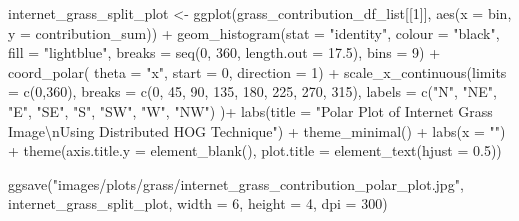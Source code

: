 \documentclass[
  letterpaper,
  DIV=11,
  numbers=noendperiod]{scrreprt}
\newenvironment{Shaded}{\begin{snugshade}}{\end{snugshade}}
\newcommand{\AttributeTok}[1]{\textcolor[rgb]{0.40,0.45,0.13}{#1}}
\newcommand{\DecValTok}[1]{\textcolor[rgb]{0.68,0.00,0.00}{#1}}
\newcommand{\FloatTok}[1]{\textcolor[rgb]{0.68,0.00,0.00}{#1}}
\newcommand{\FunctionTok}[1]{\textcolor[rgb]{0.28,0.35,0.67}{#1}}
\newcommand{\NormalTok}[1]{\textcolor[rgb]{0.00,0.23,0.31}{#1}}
\newcommand{\OtherTok}[1]{\textcolor[rgb]{0.00,0.23,0.31}{#1}}
\newcommand{\SpecialCharTok}[1]{\textcolor[rgb]{0.37,0.37,0.37}{#1}}
\newcommand{\StringTok}[1]{\textcolor[rgb]{0.13,0.47,0.30}{#1}}
\begin{document}
\begin{Shaded}
\begin{Highlighting}[]
\NormalTok{internet\_grass\_split\_plot }\OtherTok{\textless{}{-}}
  \FunctionTok{ggplot}\NormalTok{(grass\_contribution\_df\_list[[}\DecValTok{1}\NormalTok{]], }
         \FunctionTok{aes}\NormalTok{(}\AttributeTok{x =}\NormalTok{ bin, }\AttributeTok{y =}\NormalTok{ contribution\_sum)) }\SpecialCharTok{+}
  \FunctionTok{geom\_histogram}\NormalTok{(}\AttributeTok{stat =} \StringTok{"identity"}\NormalTok{,}
                 \AttributeTok{colour =} \StringTok{"black"}\NormalTok{, }
                 \AttributeTok{fill =} \StringTok{"lightblue"}\NormalTok{, }
                 \AttributeTok{breaks =} \FunctionTok{seq}\NormalTok{(}\DecValTok{0}\NormalTok{, }\DecValTok{360}\NormalTok{, }\AttributeTok{length.out =} \FloatTok{17.5}\NormalTok{),}
                 \AttributeTok{bins =} \DecValTok{9}\NormalTok{) }\SpecialCharTok{+}
  \FunctionTok{coord\_polar}\NormalTok{(}
    \AttributeTok{theta =} \StringTok{"x"}\NormalTok{, }
    \AttributeTok{start =} \DecValTok{0}\NormalTok{, }
    \AttributeTok{direction =} \DecValTok{1}\NormalTok{) }\SpecialCharTok{+}
  \FunctionTok{scale\_x\_continuous}\NormalTok{(}\AttributeTok{limits =} \FunctionTok{c}\NormalTok{(}\DecValTok{0}\NormalTok{,}\DecValTok{360}\NormalTok{),}
    \AttributeTok{breaks =} \FunctionTok{c}\NormalTok{(}\DecValTok{0}\NormalTok{, }\DecValTok{45}\NormalTok{, }\DecValTok{90}\NormalTok{, }\DecValTok{135}\NormalTok{, }\DecValTok{180}\NormalTok{, }\DecValTok{225}\NormalTok{, }\DecValTok{270}\NormalTok{, }\DecValTok{315}\NormalTok{), }
    \AttributeTok{labels =} \FunctionTok{c}\NormalTok{(}\StringTok{"N"}\NormalTok{, }\StringTok{"NE"}\NormalTok{, }\StringTok{"E"}\NormalTok{, }\StringTok{"SE"}\NormalTok{, }\StringTok{"S"}\NormalTok{, }\StringTok{"SW"}\NormalTok{, }\StringTok{"W"}\NormalTok{, }\StringTok{"NW"}\NormalTok{)}
\NormalTok{  )}\SpecialCharTok{+}
  \FunctionTok{labs}\NormalTok{(}\AttributeTok{title =} \StringTok{"Polar Plot of Internet Grass Image}\SpecialCharTok{\textbackslash{}n}\StringTok{Using Distributed HOG Technique"}\NormalTok{) }\SpecialCharTok{+}
  \FunctionTok{theme\_minimal}\NormalTok{() }\SpecialCharTok{+}
  \FunctionTok{labs}\NormalTok{(}\AttributeTok{x =} \StringTok{""}\NormalTok{) }\SpecialCharTok{+}
  \FunctionTok{theme}\NormalTok{(}\AttributeTok{axis.title.y =} \FunctionTok{element\_blank}\NormalTok{(),}
        \AttributeTok{plot.title =} \FunctionTok{element\_text}\NormalTok{(}\AttributeTok{hjust =} \FloatTok{0.5}\NormalTok{))}

\FunctionTok{ggsave}\NormalTok{(}\StringTok{"images/plots/grass/internet\_grass\_contribution\_polar\_plot.jpg"}\NormalTok{, internet\_grass\_split\_plot, }\AttributeTok{width =} \DecValTok{6}\NormalTok{, }\AttributeTok{height =} \DecValTok{4}\NormalTok{, }\AttributeTok{dpi =} \DecValTok{300}\NormalTok{)}
\end{Highlighting}
\end{Shaded}
\end{document}
